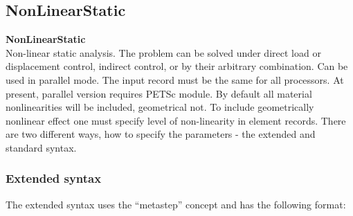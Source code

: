 \documentclass[a4paper]{article}
\newcommand{\entKeywordInst}[1]{\mbox{{\bf{{#1}}}}}
\newcommand{\Pmode}[1]{{\sffamily #1}}
\begin{document}
\subsection{NonLinearStatic}
\label{NonLinearStatic}
\entKeywordInst{NonLinearStatic} \\
Non-linear static analysis. The problem can be solved under
direct load or displacement control, indirect control, or by
their arbitrary combination.
\Pmode{Can be used in parallel mode. The input record must be the same
for all processors. At present, parallel version requires PETSc module.}
By default all
material nonlinearities will be included, geometrical not.
To include geometrically nonlinear effect one must specify
level of non-linearity in element records.
There are two different ways, how to specify the parameters - the
extended and standard syntax.
\subsubsection{Extended syntax}
The extended syntax uses the ``metastep'' concept and has the
following format:
\end{document}
